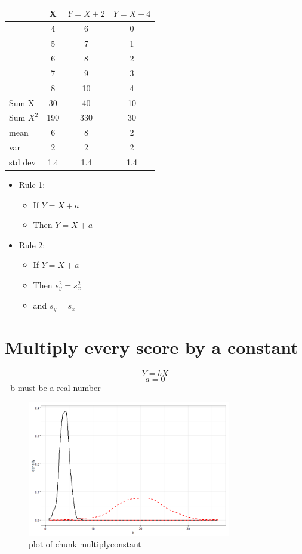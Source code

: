 \documentclass[12pt]{article}
\begin{document}
\begin{longtable}[c]{@{}lccc@{}}
\toprule
& X & \(Y = X + 2\) & \(Y = X - 4\)\tabularnewline
\midrule
\endhead
& 4 & 6 & 0\tabularnewline
& 5 & 7 & 1\tabularnewline
& 6 & 8 & 2\tabularnewline
& 7 & 9 & 3\tabularnewline
& 8 & 10 & 4\tabularnewline
\midrule 
Sum X & 30 & 40 & 10\tabularnewline
Sum \(X^2\) & 190 & 330 & 30\tabularnewline
mean & 6 & 8 & 2\tabularnewline
var & 2 & 2 & 2\tabularnewline
std dev & 1.4 & 1.4 & 1.4\tabularnewline
\bottomrule
\end{longtable}

\begin{itemize}
\itemsep1pt\parskip0pt
\item
  Rule 1:

  \begin{itemize}
  \itemsep1pt\parskip0pt
  \item
    If \(Y = X + a\)
  \item
    Then \(\bar{Y} = \bar{X} + a\)
  \end{itemize}
\item
  Rule 2:

  \begin{itemize}
  \itemsep1pt\parskip0pt
  \item
    If \(Y = X + a\)
  \item
    Then \(s_{y}^2 = s_{x}^2\)
  \item
    and \(s_{y} = s_{x}\)
  \end{itemize}
\end{itemize}

\section{Multiply every score by a
constant}\label{multiply-every-score-by-a-constant}

\[Y = bX\] \[a = 0\] - b must be a real number

\begin{figure}[H]
\centering
\includegraphics[width=3.5in]{figure/multiplyconstant-1.png}
\caption{plot of chunk multiplyconstant}
\end{figure}
\end{document}
